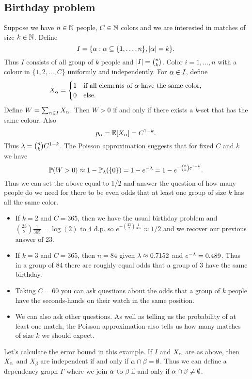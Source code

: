 \subsection{Birthday problem}
Suppose we have $n \in {{\mathbb N}}$ people, $C \in {{\mathbb N}}$ colors and we are interested in matches of size $k \in {{\mathbb N}}$. Define 
\[I = \{{\alpha} : {\alpha} \subseteq \{1,\ldots, n\}, {\left\lvert{\alpha}\right\rvert}=k\}. \] 
Thus $I$ consists of all group of $k$ people and ${\left\lvert I\right\rvert}=\binom{n}{k}$. Color $i = 1,\ldots,n$ with a colour in $\{1,2,\ldots, C\}$ uniformly and independently. For ${\alpha} \in I$, define 
\[X_{\alpha} = \begin{cases}
    1 & \text{if all elements of ${\alpha}$ have the same color},\\
    0&\text{else.}
\end{cases} \]
Define $W = \sum_{{\alpha} \in I} X_{\alpha}$. Then $W > 0$ if and only if there exists a $k$-set that has the same colour. Also
\[p_{\alpha} = {\mathbb{E}}[X_{\alpha}] = C^{1-k}. \]
Thus $\lambda = \binom{n}{k} C^{1-k}$. The Poisson approximation suggests that for fixed $C$ and $k$ we have 
\[{\mathbb{P}}(W > 0) \approx 1-{\mathbb{P}}_\lambda(\{0\}) = 1-e^{-\lambda} = 1-e^{-\binom{n}{k}c^{1-k}}. \]
Thus we can set the above equal to 1/2 and answer the question of how many people do we need for there to be even odds that at least one group of size $k$ has all the same color.
\begin{itemize}
    \item If $k=2$ and $C=365$, then we have the usual birthday problem and $\binom{23}{2}\frac{1}{365} = \log(2)$ to 4 d.p. so $e^{-\binom{23}{2}\frac{1}{365}} \approx 1/2$ and we recover our previous answer of 23.
    \item If $k=3$ and $C=365$, then $n=84$ given $\lambda \approx 0.7152$ and $e^{-\lambda} = 0.489$. Thus in a group of 84 there are roughly equal odds that a group of 3 have the same birthday.
    \item Taking $C=60$ you can ask questions about the odds that a group of $k$ people have the seconds-hands on their watch in the same position.
    \item We can also ask other questions. As well as telling us the probability of at least one match, the Poisson approximation also tells us how many matches of size $k$ we should expect.
\end{itemize}
Let's calculate the error bound in this example. If $I$ and $X_{\alpha}$ are as above, then $X_{\alpha}$ and $X_\beta$ are independent if and only if ${\alpha} \cap \beta = \emptyset$. Thus we can define a dependency graph $\Gamma$ where we join ${\alpha}$ to $\beta$ if and only if ${\alpha} \cap \beta \neq \emptyset$.
